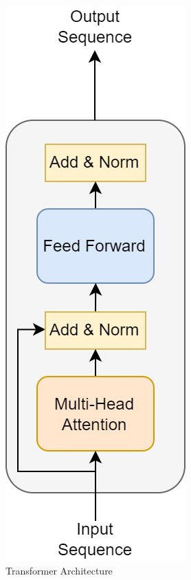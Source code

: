 \documentclass{article}
\begin{document}
\begin{figure}[H]
\centering
\includegraphics[scale=0.4]{theory/transformer.png}
\caption{Transformer Architecture}
\label{fig:transformer}
\end{figure}
\end{document}
